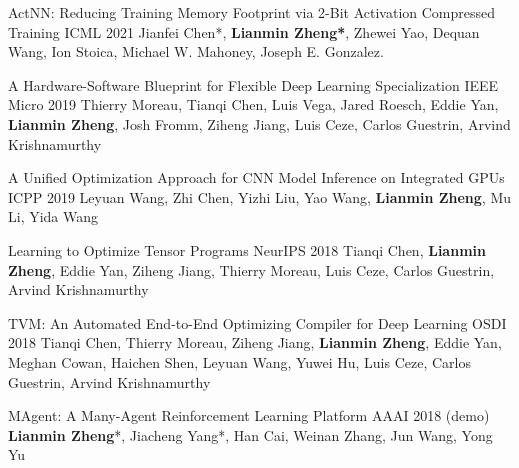 \begin{cventries}
\cventry
{}
{ActNN: Reducing Training Memory Footprint via 2-Bit Activation Compressed Training} %
{ICML 2021} %
{} %
{Jianfei Chen*, \textbf{Lianmin Zheng*}, Zhewei Yao, Dequan Wang, Ion Stoica, Michael W. Mahoney, Joseph E. Gonzalez.}

\cventry
{}
{A Hardware-Software Blueprint for Flexible Deep Learning Specialization} %
{IEEE Micro 2019} %
{} %
{Thierry Moreau, Tianqi Chen, Luis Vega, Jared Roesch, Eddie Yan, \textbf{Lianmin Zheng}, Josh Fromm, Ziheng Jiang, Luis Ceze, Carlos Guestrin, Arvind Krishnamurthy}

\cventry
{}
{A Unified Optimization Approach for CNN Model Inference on Integrated GPUs} %
{ICPP 2019} %
{} %
{Leyuan Wang, Zhi Chen, Yizhi Liu, Yao Wang, \textbf{Lianmin Zheng}, Mu Li, Yida Wang}

\cventry
{}
{Learning to Optimize Tensor Programs} %
{NeurIPS 2018} %
{} %
{Tianqi Chen, \textbf{Lianmin Zheng}, Eddie Yan, Ziheng Jiang, Thierry Moreau, Luis Ceze, Carlos Guestrin, Arvind Krishnamurthy}

\cventry
{}
{TVM: An Automated End-to-End Optimizing Compiler for Deep Learning} %
{OSDI 2018} %
{} %
{Tianqi Chen, Thierry Moreau, Ziheng Jiang, \textbf{Lianmin Zheng}, Eddie Yan, Meghan Cowan, Haichen Shen, Leyuan Wang, Yuwei Hu, Luis Ceze, Carlos Guestrin, Arvind Krishnamurthy}

\cventry
{}
{MAgent: A Many-Agent Reinforcement Learning Platform} %
{AAAI 2018 (demo)} %
{} %
{\textbf{Lianmin Zheng}*, Jiacheng Yang*, Han Cai, Weinan Zhang, Jun Wang, Yong Yu}

\end{cventries}